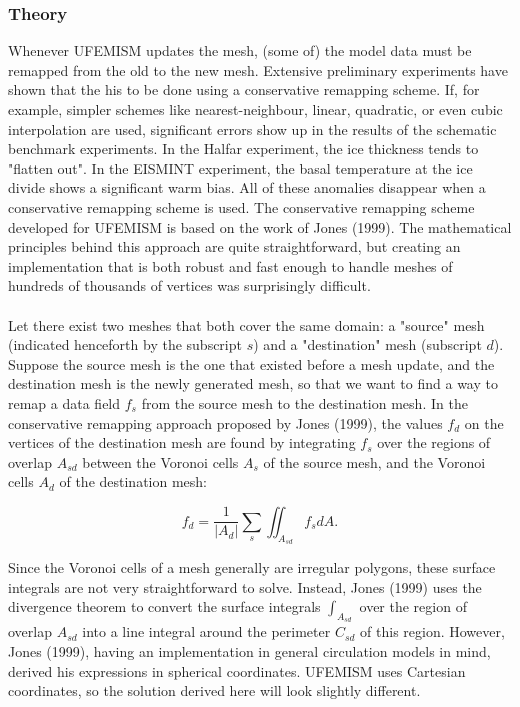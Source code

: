 \documentclass{article}
\begin{document}
\subsubsection{Theory}

Whenever UFEMISM updates the mesh, (some of) the model data must be remapped from the old to the new mesh. Extensive preliminary experiments have shown that the his to be done using a conservative remapping scheme. If, for example, simpler schemes like nearest-neighbour, linear, quadratic, or even cubic interpolation are used, significant errors show up in the results of the schematic benchmark experiments. In the Halfar experiment, the ice thickness tends to "flatten out". In the EISMINT experiment, the basal temperature at the ice divide shows a significant warm bias. All of these anomalies disappear when a conservative remapping scheme is used. The conservative remapping scheme developed for UFEMISM is based on the work of Jones (1999). The mathematical principles behind this approach are quite straightforward, but creating an implementation that is both robust and fast enough to handle meshes of hundreds of thousands of vertices was surprisingly difficult.\\
\\
Let there exist two meshes that both cover the same domain: a "source" mesh (indicated henceforth by the subscript $s$) and a "destination" mesh (subscript $d$). Suppose the source mesh is the one that existed before a mesh update, and the destination mesh is the newly generated mesh, so that we want to find a way to remap a data field $f_s$ from the source mesh to the destination mesh. In the conservative remapping approach proposed by Jones (1999), the values $f_d$ on the vertices of the destination mesh are found by integrating $f_s$ over the regions of overlap $A_{sd}$ between the Voronoi cells $A_s$ of the source mesh, and the Voronoi cells $A_d$ of the destination mesh:

\begin{equation} \label{eq:remap_sumint}
f_d = \frac{1}{|A_d|} \sum_s \iint_{A_{sd}} f_s dA.
\end{equation}

Since the Voronoi cells of a mesh generally are irregular polygons, these surface integrals are not very straightforward to solve. Instead, Jones (1999) uses the divergence theorem to convert the surface integrals $\int_{A_{sd}}$ over the region of overlap $A_{sd}$ into a line integral around the perimeter $C_{sd}$ of this region. However, Jones (1999), having an implementation in general circulation models in mind, derived his expressions in spherical coordinates. UFEMISM uses Cartesian coordinates, so the solution derived here will look slightly different.
\end{document}
